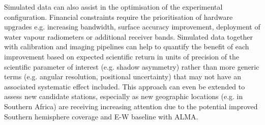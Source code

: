 Simulated data can also assist in the optimisation of the experimental configuration. Financial constraints require the prioritisation of hardware upgrades e.g. increasing bandwidth, surface accuracy improvement, deployment of water vapour radiometers or additional receiver bands. Simulated data together with calibration and imaging pipelines can help to quantify the benefit of each improvement based on expected scientific return in units of precision of the scientific parameter of interest (e.g. shadow asymmetry) rather than more generic terms (e.g. angular resolution, positional uncertainty) that may not have an associated systematic effect included. This approach can even be extended to assess new candidate stations, especially as new geographic locations (e.g. in Southern Africa) are receiving increasing attention due to the potential improved Southern hemisphere coverage and E-W baseline with ALMA.



